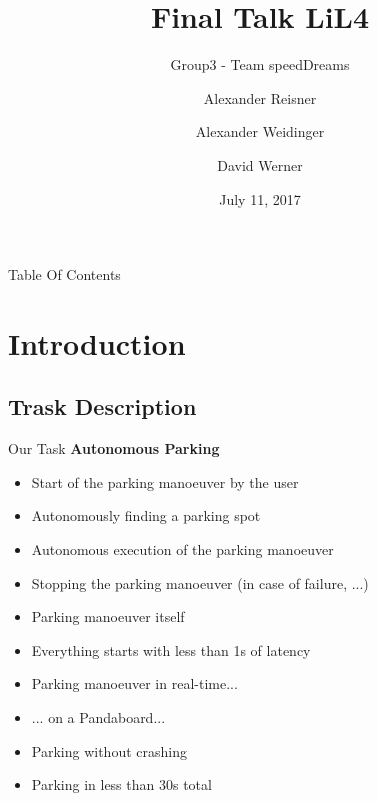 \documentclass[aspectratio=169]{beamer}
\title{Final Talk LiL4}
\subtitle{Group3 - Team speedDreams}
\date{July 11, 2017}
\author{Alexander Reisner \and
Alexander Weidinger \and
David Werner}
\institute{Technische Universität München}
\begin{document}
  \renewcommand{\figurename}{\tiny Fig.}
  \maketitle

\begin{frame}{Table Of Contents}
  \begin{multicols}{2}
  \tableofcontents
\end{multicols}
  \end{frame}

  \section{Introduction}

  \subsection{Trask Description}
  \begin{frame}{Our Task}
    \textbf{Autonomous Parking}
    \begin{itemize}
      \item<2-> Start of the parking manoeuver by the user
      \item<2-> Autonomously finding a parking spot
      \item<2-> Autonomous execution of the parking manoeuver
      \item<2-> Stopping the parking manoeuver (in case of failure, ...)
      \item<2-> Parking manoeuver itself
    \end{itemize}
    \begin{itemize}
      \item<4-> Everything starts with less than 1s of latency
      \item<4-> Parking manoeuver in real-time...
      \item<5-> ... on a Pandaboard... 
      \item<7-> Parking without crashing
      \item<7-> Parking in less than 30s total
    \end{itemize}
  \end{frame}
\end{document}
